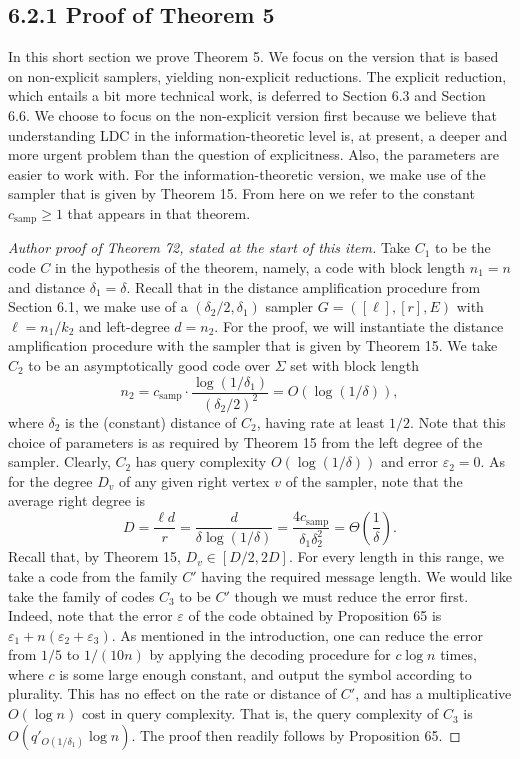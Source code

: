 \documentclass[10pt,a4paper]{article}
\begin{document}
\subsection*{6.2.1 Proof of Theorem 5}
In this short section we prove Theorem 5. We focus on the version that is based on non-explicit samplers, yielding non-explicit reductions. The explicit reduction, which entails a bit more technical work, is deferred to Section 6.3 and Section 6.6. We choose to focus on the non-explicit version first because we believe that understanding LDC in the information-theoretic level is, at present, a deeper and more urgent problem than the question of explicitness. Also, the parameters are easier to work with. For the information-theoretic version, we make use of the sampler that is given by Theorem 15. From here on we refer to the constant $c_{\mathrm{samp}}\geq1$ that appears in that theorem.
\begin{proof}[Author proof of Theorem 72, stated at the start of this item]
Take $C_1$ to be the code $C$ in the hypothesis of the theorem, namely, a code with block length $n_1=n$ and distance $\delta_1=\delta$. Recall that in the distance amplification procedure from Section 6.1, we make use of a $(\delta_2/2,\delta_1)$ sampler $G=([\ell],[r],E)$ with $\ell=n_1/k_2$ and left-degree $d=n_2$. For the proof, we will instantiate the distance amplification procedure with the sampler that is given by Theorem 15. We take $C_2$ to be an asymptotically good code over $\Sigma$ set with block length
\[n_2=c_{\mathrm{samp}}\cdot\frac{\log(1/\delta_1)}{(\delta_2/2)^2}=O(\log(1/\delta)),\]
where $\delta_2$ is the (constant) distance of $C_2$, having rate at least $1/2$. Note that this choice of parameters is as required by Theorem 15 from the left degree of the sampler. Clearly, $C_2$ has query complexity $O(\log(1/\delta))$ and error $\varepsilon_2=0$. As for the degree $D_v$ of any given right vertex $v$ of the sampler, note that the average right degree is
\[D=\frac{\ell d}{r}=\frac d{\delta\log(1/\delta)}=\frac{4c_{\mathrm{samp}}}{\delta_1\delta_2^2}=\Theta\left(\frac1\delta\right).\]
Recall that, by Theorem 15, $D_v\in[D/2,2D]$. For every length in this range, we take a code from the family $C'$ having the required message length. We would like take the family of codes $C_3$ to be $C'$ though we must reduce the error first. Indeed, note that the error $\varepsilon$ of the code obtained by Proposition 65 is $\varepsilon_1+n(\varepsilon_2+\varepsilon_3)$. As mentioned in the introduction, one can reduce the error from $1/5$ to $1/(10n)$ by applying the decoding procedure for $c\log n$ times, where $c$ is some large enough constant, and output the symbol according to plurality. This has no effect on the rate or distance of $C'$, and has a multiplicative $O(\log n)$ cost in query complexity. That is, the query complexity of $C_3$ is $O(q'_{O(1/\delta_1)}\log n)$. The proof then readily follows by Proposition 65.
\end{proof}
\end{document}
